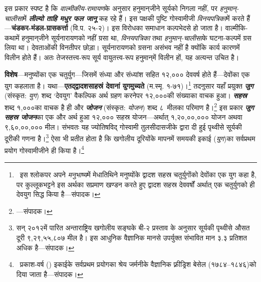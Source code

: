 \begin{sloppypar}\justifying{}
इस प्रकार स्पष्ट है कि \textit{वाल्मीकीय-रामायण}के अनुसार हनुमान्‌जीने सूर्यको निगला नहीं, पर \textit{हनुमान्‌-चालीसा}में \textbf{\textit{लील्यो ताहि मधुर फल जानू}} कह रहे हैं। इस पक्षकी पुष्टि गोस्वामीजी \textit{विनयपत्रिका}में करते हैं—\textbf{चंडकर-मंडल-ग्रासकर्त्ता} (वि.प. २५-२)। इस विरोधका समाधान कल्पभेदसे हो जाता है। वाल्मीकि-कथामें हनुमान्‌जीने सूर्यनारायणको नहीं ग्रसा था, \textit{विनयपत्रिका} तथा \textit{हनुमान्‌-चालीसा}के घटना-कल्पमें ग्रस लिया था। देवताओंकी विनतीपर छोड़ा। सूर्यनारायणको ग्रसना असंभव नहीं है क्योंकि कार्य कारणमें विलीन होते हैं। अतः तेजस्तत्त्व-रूप सूर्य वायुतत्त्व-रूप हनुमान्‌में विलीन हों, यह अत्यन्त उचित है।
\end{sloppypar}


\begin{sloppypar}\justifying{}
\textbf{विशेष}—मनुष्योंका एक चतुर्युग—जिसमें संध्या और संध्यांश सहित १२,००० देववर्ष होते हैं—देवोंका एक युग कहलाता है। यथा—\textbf{एतद्‌\-द्वादशसाहस्रं देवानां युगमुच्यते} (म.स्मृ. १-७१)।\footnote{\ इस श्लोकपर अपने \textit{मनुभाष्य}में मेधातिथिने मनुष्योंके द्वादश सहस्र चतुर्युगोंको देवोंका एक युग कहा है, पर कुल्लूकभट्टने इस अर्थका सप्रमाण खण्डन करते हुए द्वादश सहस्र देववर्षों अर्थात् एक चतुर्युगको ही देवयुग सिद्ध किया है—संपादक।} तदनुसार यहाँ प्रयुक्त \textbf{\textit{जुग}} (संस्कृत: \textit{युग}) शब्द ‘देवयुग’ वैकल्पिक अर्थ ग्रहण करनेपर  १२,०००की संख्याका वाचक हुआ। \textbf{\textit{सहस्र}} शब्द १,०००का वाचक है ही और \textbf{\textit{जोजन}} (संस्कृत: \textit{योजन}) शब्द ८~मीलका परिमाण है।\footnote{{}—संपादक।} इस प्रकार \textbf{\textit{जुग सहस्र जोजन}}का एक और अर्थ हुआ १२,००० सहस्र योजन—अर्थात् १,२०,००,००० योजन अथवा ९,६०,००,००० मील। संभवतः यह ज्योतिषविद् गोस्वामी तुलसीदासजीके द्वारा दी हुई पृथ्वीसे सूर्यकी दूरीकी गणना है।\footnote{ सन् २०१२में पारित अन्ताराष्ट्रिय खगोलीय सङ्घके बी-२ प्रस्ताव के अनुसार सूर्यकी पृथ्वीसे औसत दूरी ९,२९,५५,८०७ मील है। इस आधुनिक वैज्ञानिक मानसे उपर्युक्त संभावित मान ३.३ प्रतिशत अधिक है—संपादक।} ऐसा भी प्रतीत होता है कि खगोलीय दूरियोंके मापनमें समयकी इकाई (\textit{युग})का सर्वप्रथम प्रयोग गोस्वामीजीने ही किया है।\footnote{\ प्रकाश-वर्ष ({}) इकाईके सर्वप्रथम प्रयोगका श्रेय जर्मनीके वैज्ञानिक फ़्रीड्रिश बेसेल (१७८४–१८४६)को दिया जाता है—संपादक।}\end{sloppypar}
\pagebreak


